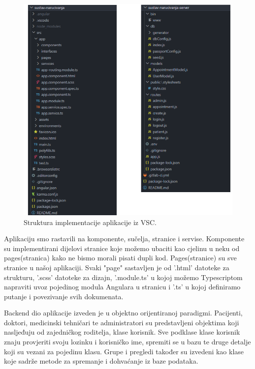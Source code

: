              \begin{figure}[H]
			            \includegraphics[width=\textwidth]{slike/struktura.png} %
			            \caption{Struktura implementacije aplikacije iz VSC.}
			            \label{fig:promjene2} %
		            \end{figure}

              
               \texttt{}{ Aplikaciju smo rastavili na komponente, sučelja, stranice i servise. 
               Komponente su implementirani dijelovi stranice koje možemo ubaciti kao cjelinu u neku od pages(stranica) kako ne bismo morali pisati dupli kod. Pages(stranice) su sve stranice u našoj aplikaciji. Svaki "page" sastavljen je od '.html' datoteke za strukturu, '.scss' datoteke za dizajn, '.module.ts' u kojoj možemo Typescriptom napraviti uvoz pojedinog modula Angulara u stranicu i '.ts' u kojoj definiramo putanje i povezivanje svih dokumenata.
               
               }

                \texttt{}{ Backend dio aplikacije izveden je u objektno orijentiranoj paradigmi. Pacijenti, doktori, medicinski tehničari te administratori su predstavljeni objektima koji nasljeđuju od zajedničkog roditelja, klase korisnik. Sve podklase klase korisnik znaju provjeriti svoju lozinku i korisničko ime, spremiti se u bazu te druge detalje koji su vezani za pojedinu klasu. Grupe i pregledi također su izvedeni kao klase koje sadrže metode za spremanje i dohvaćanje iz baze podataka.
               }
        
